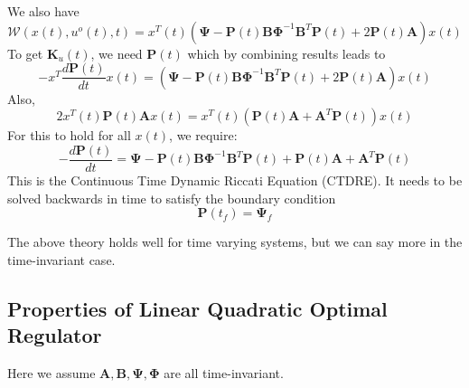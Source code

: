 \documentclass{book}
\begin{document}
We also have
\begin{equation}
\mathcal{W} (x (t), u^{ o } (t), t) = x^{ T } (t)
\left( 
\bm{\Psi} - \bm{P} (t) \bm{B} \bm{\Phi}^{ -1 } \bm{B}^{ T } \bm{P} (t) + 2 \bm{P} (t) \bm{A}
\right) x (t)
\end{equation}
To get $ \bm{K}_{ u } (t)  $, we need $ \bm{P} (t)  $
which by combining results leads to 
\begin{equation}
-x^{ T } \frac{d \bm{P} (t)}{dt}  x (t) = 
\left( 
\bm{\Psi} - \bm{P} (t) \bm{B} \bm{\Phi}^{ -1 } \bm{B}^{ T } \bm{P} (t) + 2 \bm{P} (t) \bm{A}
\right) x (t)
\end{equation}
Also,
\begin{equation}
		2 x ^{ T } ( t) \bm{P} (t) \bm{A}x (t) = x^{ T } (t) \left( 
\bm{P} (t) \bm{A} + \bm{A}^{ T } \bm{P} (t)
		\right) x (t)
\end{equation}
For this to hold for all $ x (t)  $, we require:
\begin{equation}
		\label{-eq-ctdre}
- \frac{d \bm{P} (t)}{dt}  =
\bm{\Psi} - \bm{P} (t) \bm{B} \bm{\Phi} ^{ -1 }\bm{B}^{ T } \bm{P} (t) + 
\bm{P} (t) \bm{A} + \bm{A}^{ T } \bm{P} (t)
\end{equation}
This is the Continuous Time Dynamic Riccati Equation (CTDRE).
It needs to be solved backwards in time to satisfy the boundary condition
\begin{equation}
\bm{P} (t_{ f }) = \bm{\Psi}_{ f }
\end{equation}

The above theory holds well for time varying systems,
but we can say more in the time-invariant case.

\subsection{Properties of Linear Quadratic Optimal Regulator}
Here we assume $ \bm{A},\bm{B}, \bm{\Psi}, \bm{\Phi}  $ are all time-invariant.
\end{document}
